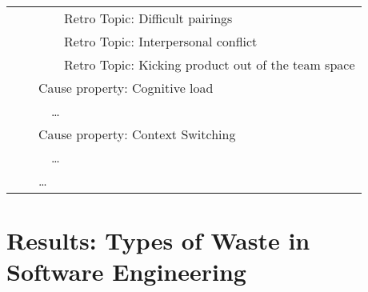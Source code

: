 \begin{table}[ht]
\begin{tabular}{|lllll|}
    &     &     &      & Retro Topic: Difficult pairings \\
    &     &     &      & Retro Topic: Interpersonal conflict \\
    &     &     &      & Retro Topic: Kicking product out of the team space \\
    &     & \multicolumn{3}{l|}{Cause property: Cognitive load}          \\
    &     &     & \multicolumn{2}{l|}{\dots} \\
    &     & \multicolumn{3}{l|}{Cause property: Context Switching}          \\
    &     &     & \multicolumn{2}{l|}{\dots} \\
    &     & \multicolumn{3}{l|}{\dots} \\
\hline
\end{tabular}
\end{table}




\section{Results: Types of Waste in Software Engineering}
\label{SEWaste}

